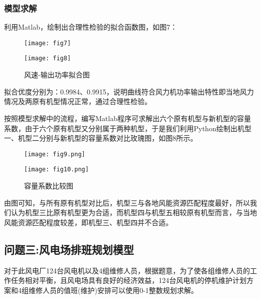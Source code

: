 \documentclass[withoutpreface,bwprint]{cumcmthesis} %
\begin{document}
		\subsubsection{模型求解}
		利用Matlab，绘制出合理性检验的拟合函数图，如图7：
\begin{figure}[!h]
	\centering
	\begin{minipage}[c]{0.48\textwidth}
		\centering
		\texttt{[image: fig7]}
		\label{fig:sample-figure-a}
	\end{minipage}
	\begin{minipage}[c]{0.48\textwidth}
		\centering
		\texttt{[image: fig8]}
		\label{fig:sample-figure-b}
	\end{minipage}	
	\caption{风速-输出功率拟合图}
	\label{fig:sample-figure}
\end{figure}\par
		拟合优度分别为：0.9984、0.9915，说明曲线符合风力机功率输出特性即当地风力情况及两原有机型情况正常，通过合理性检验。\par
		按照模型求解中的流程，编写Matlab程序可求解出六个原有机型与新机型的容量系数，由于六个原有机型又分别属于两种机型，于是我们利用Python绘制出机型一、机型二分别与新机型的容量系数对比玫瑰图，如图8所示。
		\begin{figure}
			\centering
			\begin{minipage}[c]{0.95\textwidth}
				\centering
				\texttt{[image: fig9.png]}
			\end{minipage}
			\begin{minipage}[c]{0.95\textwidth}
				\centering
				\texttt{[image: fig10.png]}
			\end{minipage}
			\caption{容量系数比较图}
		\end{figure}\par
		由图可知，与所有原有机型对比后，机型三与各地风能资源匹配程度最好，所以我们认为机型三比原有机型更为合适，而机型四与机型五相较原有机型而言，与当地风能资源匹配程度较差，即机型三、机型四并不合适。
		\subsection{问题三:风电场排班规划模型}
		对于此风电厂124台风电机以及4组维修人员，根据题意，为了使各组维修人员的工作任务相对平衡，且风电场具有良好的经济效益，124台风电机的停机维护计划方案和4组维修人员的值班(维护)安排可以使用0-1整数规划求解。
\end{document}
